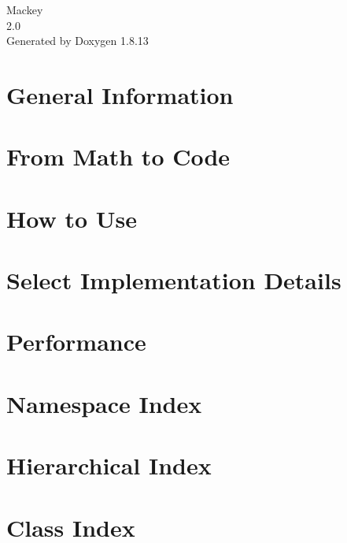 \documentclass[twoside]{book}
\newcommand{\+}{\discretionary{\mbox{\scriptsize$\hookleftarrow$}}{}{}}
\newcommand{\clearemptydoublepage}{%
  \newpage{\pagestyle{empty}\cleardoublepage}%
}
\begin{document}
\hypersetup{pageanchor=false,
             bookmarksnumbered=true,
             pdfencoding=unicode
            }
\begin{titlepage}
\vspace*{7cm}
\begin{center}%
{\Large Mackey \\[1ex]\large 2.\+0 }\\
\vspace*{1cm}
{\large Generated by Doxygen 1.8.13}\\
\end{center}
\end{titlepage}
\clearemptydoublepage
{}
\tableofcontents
\clearemptydoublepage
{}
\hypersetup{pageanchor=true}

\chapter{General Information}
\label{index}\hypertarget{index}{}
\chapter{From Math to Code}
\label{math}

\chapter{How to Use}
\label{use}

\chapter{Select Implementation Details}
\label{algo}

\chapter{Performance}
\label{perf}

\chapter{Namespace Index}

\chapter{Hierarchical Index}

\chapter{Class Index}

\end{document}
